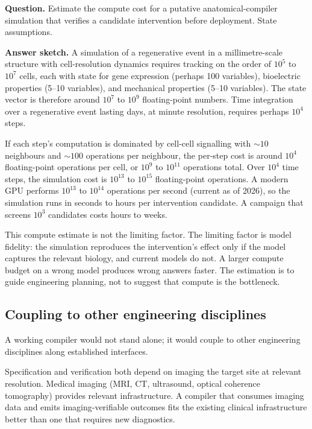 \begin{estimation}
\textbf{Question.} Estimate the compute cost for a putative
anatomical-compiler simulation that verifies a candidate intervention
before deployment. State assumptions.

\textbf{Answer sketch.} A simulation of a regenerative event in a
millimetre-scale structure with cell-resolution dynamics requires
tracking on the order of $10^5$ to $10^7$ cells, each with state for
gene expression (perhaps 100 variables), bioelectric properties (5--10
variables), and mechanical properties (5--10 variables). The state
vector is therefore around $10^7$ to $10^9$ floating-point numbers.
Time integration over a regenerative event lasting days, at minute
resolution, requires perhaps $10^4$ steps.

If each step's computation is dominated by cell-cell signalling with
$\sim 10$ neighbours and $\sim 100$ operations per neighbour, the
per-step cost is around $10^4$ floating-point operations per cell, or
$10^9$ to $10^{11}$ operations total. Over $10^4$ time steps, the
simulation cost is $10^{13}$ to $10^{15}$ floating-point operations. A
modern GPU performs $10^{13}$ to $10^{14}$ operations per second
(current as of 2026), so the simulation runs in seconds to hours per
intervention candidate. A campaign that screens $10^3$ candidates
costs hours to weeks.

This compute estimate is not the limiting factor. The limiting factor
is model fidelity: the simulation reproduces the intervention's effect
only if the model captures the relevant biology, and current models do
not. A larger compute budget on a wrong model produces wrong answers
faster. The estimation is to guide engineering planning, not to
suggest that compute is the bottleneck.
\end{estimation}

\subsection{Coupling to other engineering disciplines}

A working compiler would not stand alone; it would couple to other
engineering disciplines along established interfaces.

 Specification and verification both depend on
imaging the target site at relevant resolution. Medical imaging
(MRI, CT, ultrasound, optical coherence tomography) provides relevant
infrastructure. A compiler that consumes imaging data and emits
imaging-verifiable outcomes fits the existing clinical infrastructure
better than one that requires new diagnostics.

